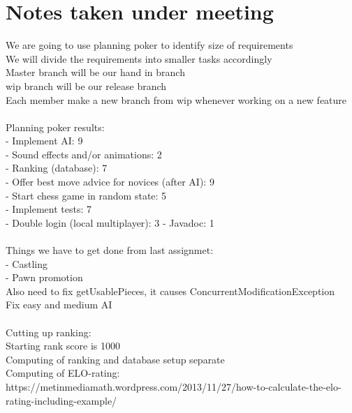 \documentclass[letterpaper,11pt]{article}
\begin{document}
\section*{Notes taken under meeting}
We are going to use planning poker to identify size of requirements\\
We will divide the requirements into smaller tasks accordingly\\
Master branch will be our hand in branch\\
wip branch will be our release branch\\
Each member make a new branch from wip whenever working on a new feature\\\\
Planning poker results:\\
- Implement AI: 9\\
- Sound effects and/or animations: 2\\
- Ranking (database): 7\\
- Offer best move advice for novices (after AI): 9\\ 
- Start chess game in random state: 5\\
- Implement tests: 7\\
- Double login (local multiplayer): 3
- Javadoc: 1\\\\
Things we have to get done from last assignmet:\\
- Castling\\
- Pawn promotion\\
Also need to fix getUsablePieces, it causes ConcurrentModificationException\\
Fix easy and medium AI\\\\
Cutting up ranking:\\
Starting rank score is 1000\\
Computing of ranking and database setup separate\\
Computing of ELO-rating: https://metinmediamath.wordpress.com/2013/11/27/how-to-calculate-the-elo-rating-including-example/\\
\end{document}
